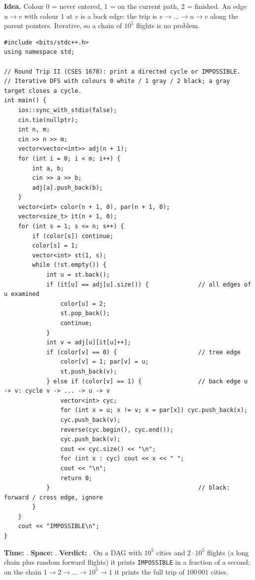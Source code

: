 \begin{algorithmbox}
\textbf{Idea.} Colour 0 = never entered, 1 = on the current path, 2 = finished. An edge $u \to v$ with colour 1 at $v$ is a back edge: the trip is $v \to \dots \to u \to v$ along the parent pointers. Iterative, so a chain of $10^5$ flights is no problem.

\begin{lstlisting}[style=cpp]
#include <bits/stdc++.h>
using namespace std;

// Round Trip II (CSES 1678): print a directed cycle or IMPOSSIBLE.
// Iterative DFS with colours 0 white / 1 gray / 2 black; a gray target closes a cycle.
int main() {
    ios::sync_with_stdio(false);
    cin.tie(nullptr);
    int n, m;
    cin >> n >> m;
    vector<vector<int>> adj(n + 1);
    for (int i = 0; i < m; i++) {
        int a, b;
        cin >> a >> b;
        adj[a].push_back(b);
    }
    vector<int> color(n + 1, 0), par(n + 1, 0);
    vector<size_t> it(n + 1, 0);
    for (int s = 1; s <= n; s++) {
        if (color[s]) continue;
        color[s] = 1;
        vector<int> st(1, s);
        while (!st.empty()) {
            int u = st.back();
            if (it[u] == adj[u].size()) {              // all edges of u examined
                color[u] = 2;
                st.pop_back();
                continue;
            }
            int v = adj[u][it[u]++];
            if (color[v] == 0) {                       // tree edge
                color[v] = 1; par[v] = u;
                st.push_back(v);
            } else if (color[v] == 1) {                // back edge u -> v: cycle v -> ... -> u -> v
                vector<int> cyc;
                for (int x = u; x != v; x = par[x]) cyc.push_back(x);
                cyc.push_back(v);
                reverse(cyc.begin(), cyc.end());
                cyc.push_back(v);
                cout << cyc.size() << "\n";
                for (int x : cyc) cout << x << " ";
                cout << "\n";
                return 0;
            }                                          // black: forward / cross edge, ignore
        }
    }
    cout << "IMPOSSIBLE\n";
}
\end{lstlisting}

\begin{complexitybox}
\textbf{Time:} \VE. \textbf{Space:} . \textbf{Verdict:} \ac{}. On a DAG with $10^5$ cities and $2\cdot10^5$ flights (a long chain plus random forward flights) it prints \texttt{IMPOSSIBLE} in a fraction of a second; on the chain $1 \to 2 \to \dots \to 10^5 \to 1$ it prints the full trip of $100\,001$ cities.
\end{complexitybox}
\end{algorithmbox}

